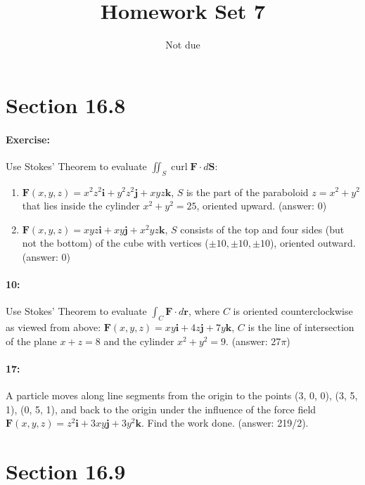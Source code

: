 \documentclass[10pt,letter]{article}
\DeclareMathOperator{\curl}{curl}
\newcommand{\F}{\mathbf{F}}
\renewcommand{\i}{\mathbf{i}}
\renewcommand{\j}{\mathbf{j}}
\renewcommand{\k}{\mathbf{k}}
\newcommand{\sint}{\iint_S\curl\F\cdot d\mathbf{S}}
\newcommand{\lint}{\int_C\F\cdot d\mathbf{r}}
\begin{document}


\title{Homework Set 7}


\date{Not due}
 
\maketitle 

\section*{Section 16.8}
\paragraph{Exercise:} Use Stokes' Theorem to evaluate $\sint$:\begin{enumerate}
\item $\F(x,y,z)=x^2z^2\i+y^2z^2\j+xyz\k$, $S$ is the part of the paraboloid $z=x^2+y^2$ that lies inside the cylinder $x^2+y^2=25$, oriented upward. (answer: 0)
\item $\F(x,y,z)=xyz\i+xy\j+x^2yz\k$, $S$ consists of the top and four sides (but not the bottom) of the cube with vertices ($\pm 10,\pm 10,\pm 10$), oriented outward. (answer: 0)
\end{enumerate}

\paragraph{10:} Use Stokes' Theorem to evaluate $\lint$, where $C$ is oriented counterclockwise as viewed from above: $\F(x,y,z)=xy\i+4z\j+7y\k$, $C$ is the line of intersection of the plane $x+z=8$ and the cylinder $x^2+y^2=9$. (answer: 27$\pi$)

\paragraph{17:}
A particle moves along line segments from the origin to the points (3, 0, 0), (3, 5, 1), (0, 5, 1), and back to the origin under the influence of the force field $\F(x,y,z)=z^2\i+3xy\j+3y^2\k$. Find the work done. (answer: 219/2).


\section*{Section 16.9}
\end{document}
